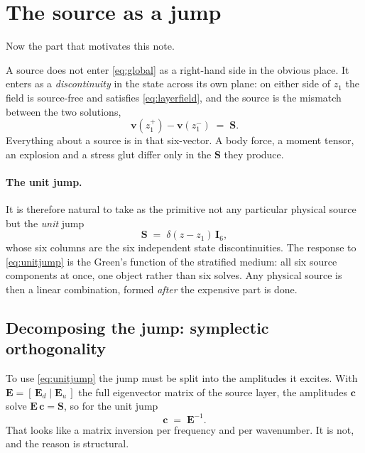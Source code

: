 \documentclass[11pt,a4paper]{article}
\newcommand{\bI}{\mathbf{I}}
\newcommand{\bE}{\mathbf{E}}
\newcommand{\bv}{\mathbf{v}}
\begin{document}
\section{The source as a jump}
\label{sec:jump}

Now the part that motivates this note.

A source does not enter \eqref{eq:global} as a right-hand side in the obvious
place. It enters as a \emph{discontinuity} in the state across its own plane: on
either side of $z_1$ the field is source-free and satisfies
\eqref{eq:layerfield}, and the source is the mismatch between the two
solutions,
\begin{equation}\label{eq:jumpdef}
  \bv(z_1^{+}) - \bv(z_1^{-}) \;=\; \mathbf{S}.
\end{equation}
Everything about a source is in that six-vector. A body force, a moment tensor,
an explosion and a stress glut differ only in the $\mathbf{S}$ they produce.

\paragraph{The unit jump.} It is therefore natural to take as the primitive not
any particular physical source but the \emph{unit} jump
\begin{equation}\label{eq:unitjump}
  \mathbf{S} \;=\; \delta(z-z_1)\,\bI_6 ,
\end{equation}
whose six columns are the six independent state discontinuities. The response to
\eqref{eq:unitjump} is the Green's function of the stratified medium: all six
source components at once, one object rather than six solves. Any physical
source is then a linear combination, formed \emph{after} the expensive part is
done.

\subsection{Decomposing the jump: symplectic orthogonality}

To use \eqref{eq:unitjump} the jump must be split into the amplitudes it
excites. With $\bE=[\,\bE_d\mid\bE_u\,]$ the full eigenvector matrix of the
source layer, the amplitudes $\mathbf{c}$ solve $\bE\,\mathbf{c}=\mathbf{S}$,
so for the unit jump
\begin{equation}\label{eq:cinv}
  \mathbf{c} \;=\; \bE^{-1}.
\end{equation}
That looks like a matrix inversion per frequency and per wavenumber. It is not,
and the reason is structural.
\end{document}
